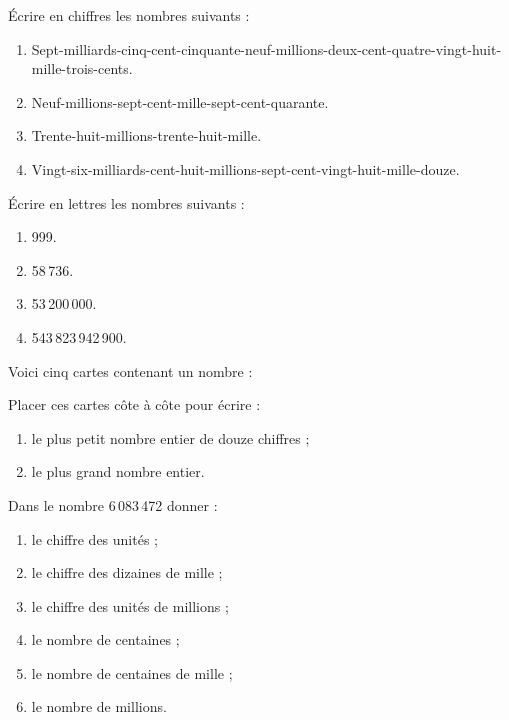 \begin{colonne*exercice}


\begin{exercice} %
   Écrire en chiffres les nombres suivants :
   \begin{enumerate}
      \item Sept-milliards-cinq-cent-cinquante-neuf-millions-deux-cent-quatre-vingt-huit-mille-trois-cents.
      \item Neuf-millions-sept-cent-mille-sept-cent-quarante. 
      \item Trente-huit-millions-trente-huit-mille.
      \item Vingt-six-milliards-cent-huit-millions-sept-cent-vingt-huit-mille-douze.
   \end{enumerate}
\end{exercice}

\bigskip

\begin{exercice} %
   Écrire en lettres les nombres suivants :
   \begin{enumerate}
      \item 999.
      \item 58\,736.
      \item 53\,200\,000.
      \item 543\,823\,942\,900.
   \end{enumerate}
\end{exercice}

\bigskip

\begin{exercice}
   Voici cinq cartes contenant un nombre :
   \begin{center}
       \qquad {} \qquad {} \qquad {} \qquad{}
   \end{center}
   Placer ces cartes côte à côte pour écrire :
   \begin{enumerate}
      \item le plus petit nombre entier de douze chiffres ;
      \item le plus grand nombre entier.
   \end{enumerate}
\end{exercice}

\bigskip

\begin{exercice}
   Dans le nombre 6\,083\,472 donner :
   \begin{enumerate}
      \item le chiffre des unités ;
      \item le chiffre des dizaines de mille ;
      \item le chiffre des unités de millions ;
      \item le nombre de centaines ;
      \item le nombre de centaines de mille ;
      \item le nombre de millions.
   \end{enumerate}
\end{exercice}


\end{colonne*exercice}
